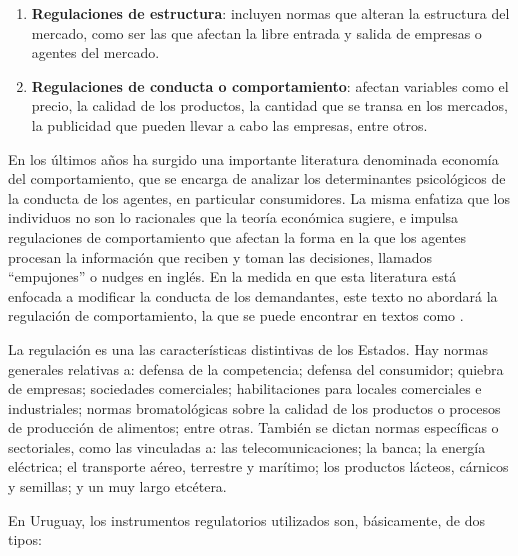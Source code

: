 \documentclass[
  12pt,
  spanish,
]{book}
\begin{document}
\begin{enumerate}
\def\labelenumi{\arabic{enumi}.}
\item
  \textbf{Regulaciones de estructura}: incluyen normas que alteran la
  estructura del mercado, como ser las que afectan la libre entrada y
  salida de empresas o agentes del mercado.
\item
  \textbf{Regulaciones de conducta o comportamiento}: afectan variables
  como el precio, la calidad de los productos, la cantidad que se transa
  en los mercados, la publicidad que pueden llevar a cabo las empresas,
  entre otros.
\end{enumerate}

En los últimos años ha surgido una importante literatura denominada
economía del comportamiento, que se encarga de analizar los
determinantes psicológicos de la conducta de los agentes, en particular
consumidores. La misma enfatiza que los individuos no son lo racionales
que la teoría económica sugiere, e impulsa regulaciones de
comportamiento que afectan la forma en la que los agentes procesan la
información que reciben y toman las decisiones, llamados ``empujones'' o
nudges en inglés. En la medida en que esta literatura está enfocada a
modificar la conducta de los demandantes, este texto no abordará la
regulación de comportamiento, la que se puede encontrar en textos como
\citep[ o \citet{Kanheman2015}]{Sunstein2009}.

La regulación es una las características distintivas de los Estados. Hay
normas generales relativas a: defensa de la competencia; defensa del
consumidor; quiebra de empresas; sociedades comerciales; habilitaciones
para locales comerciales e industriales; normas bromatológicas sobre la
calidad de los productos o procesos de producción de alimentos; entre
otras. También se dictan normas específicas o sectoriales, como las
vinculadas a: las telecomunicaciones; la banca; la energía eléctrica; el
transporte aéreo, terrestre y marítimo; los productos lácteos, cárnicos
y semillas; y un muy largo etcétera.

En Uruguay, los instrumentos regulatorios utilizados son, básicamente,
de dos tipos:
\end{document}
